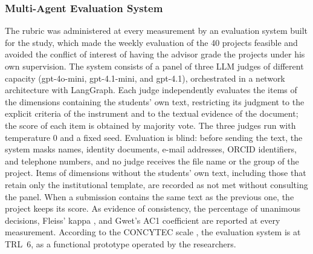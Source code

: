 \documentclass[journal]{IEEEtran}
\begin{document}
\subsubsection{Multi-Agent Evaluation System}
The rubric was administered at every measurement by an evaluation system built for the study, which made the weekly evaluation of the 40 projects feasible and avoided the conflict of interest of having the advisor grade the projects under his own supervision. The system consists of a panel of three LLM judges of different capacity (gpt-4o-mini, gpt-4.1-mini, and gpt-4.1), orchestrated in a network architecture with LangGraph. Each judge independently evaluates the items of the dimensions containing the students' own text, restricting its judgment to the explicit criteria of the instrument and to the textual evidence of the document; the score of each item is obtained by majority vote. The three judges run with temperature 0 and a fixed seed. Evaluation is blind: before sending the text, the system masks names, identity documents, e-mail addresses, ORCID identifiers, and telephone numbers, and no judge receives the file name or the group of the project. Items of dimensions without the students' own text, including those that retain only the institutional template, are recorded as not met without consulting the panel. When a submission contains the same text as the previous one, the project keeps its score. As evidence of consistency, the percentage of unanimous decisions, Fleiss' kappa \cite{fleiss1971}, and Gwet's AC1 coefficient \cite{gwet2008} are reported at every measurement. According to the CONCYTEC scale \cite{concytec2022}, the evaluation system is at TRL~6, as a functional prototype operated by the researchers.
\end{document}
